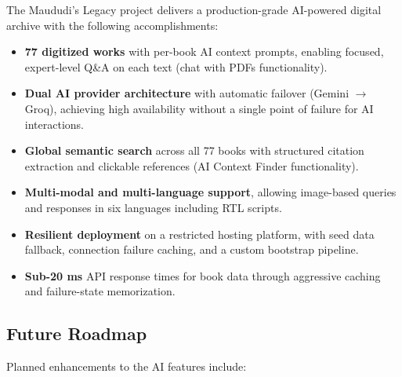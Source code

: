 \documentclass[11pt,a4paper]{article}
\begin{document}
The Maududi's Legacy project delivers a production-grade AI-powered digital archive with the following accomplishments:
 
\begin{itemize}
    \item \textbf{77 digitized works} with per-book AI context prompts, enabling focused, expert-level Q\&A on each text (chat with PDFs functionality).
    \item \textbf{Dual AI provider architecture} with automatic failover (Gemini $\rightarrow$ Groq), achieving high availability without a single point of failure for AI interactions.
    \item \textbf{Global semantic search} across all 77 books with structured citation extraction and clickable references (AI Context Finder functionality).
    \item \textbf{Multi-modal and multi-language support}, allowing image-based queries and responses in six languages including RTL scripts.
    \item \textbf{Resilient deployment} on a restricted hosting platform, with seed data fallback, connection failure caching, and a custom bootstrap pipeline.
    \item \textbf{Sub-20 ms} API response times for book data through aggressive caching and failure-state memorization.
\end{itemize}
 
\subsection{Future Roadmap}
 
Planned enhancements to the AI features include:
 
\end{document}
